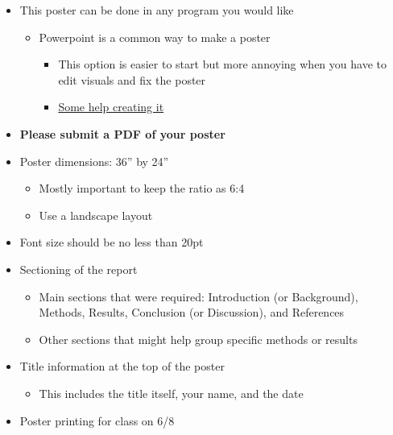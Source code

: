 \documentclass[
  letterpaper,
  DIV=11,
  numbers=noendperiod]{scrartcl}
\providecommand{\tightlist}{%
  \setlength{\itemsep}{0pt}\setlength{\parskip}{0pt}}
\begin{document}
\begin{itemize}
\tightlist
\item
  This poster can be done in any program you would like

  \begin{itemize}
  \tightlist
  \item
    Powerpoint is a common way to make a poster

    \begin{itemize}
    \tightlist
    \item
      This option is easier to start but more annoying when you have to
      edit visuals and fix the poster
    \item
      \href{https://www.slidesai.io/blog/how-to-make-a-poster-powerpoint}{Some
      help creating it}
    \end{itemize}
  \end{itemize}
\item
  \textbf{Please submit a PDF of your poster}
\item
  Poster dimensions: 36'' by 24''

  \begin{itemize}
  \tightlist
  \item
    Mostly important to keep the ratio as 6:4
  \item
    Use a landscape layout
  \end{itemize}
\item
  Font size should be no less than 20pt
\item
  Sectioning of the report

  \begin{itemize}
  \tightlist
  \item
    Main sections that were required: Introduction (or Background),
    Methods, Results, Conclusion (or Discussion), and References
  \item
    Other sections that might help group specific methods or results
  \end{itemize}
\item
  Title information at the top of the poster

  \begin{itemize}
  \tightlist
  \item
    This includes the title itself, your name, and the date
  \end{itemize}
\item
  Poster printing for class on 6/8


\end{itemize}
\end{document}
